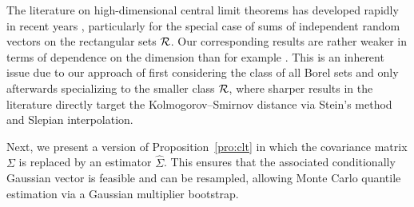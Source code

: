 \begin{remark}

  The literature on high-dimensional central limit theorems
  has developed rapidly in recent years
  \citep[see][and references therein]{%
    zhai2018high,%
    koike2021notes,%
    buzun2022strong,%
    lopes2022central,%
    chernozhukov2023nearly%
  },
  particularly for the special case of
  sums of independent random vectors
  on the rectangular sets $\mathcal{R}$.
  Our corresponding results are rather weaker in terms of
  dependence on the dimension than for example
  \citet[Theorem~2.1]{chernozhukov2023nearly}.
  This is an inherent issue due to our approach
  of first
  considering the class of all Borel sets
  and only afterwards specializing to the smaller class $\mathcal{R}$,
  where sharper results in the literature directly target the
  Kolmogorov--Smirnov distance via Stein's method and Slepian interpolation.
\end{remark}

Next, we present a version of Proposition~\ref{pro:clt} in which the covariance
matrix $\Sigma$ is replaced by an estimator $\hat \Sigma$. This ensures that
the associated conditionally Gaussian vector is feasible and can be resampled,
allowing Monte Carlo quantile estimation via a Gaussian
multiplier bootstrap.

